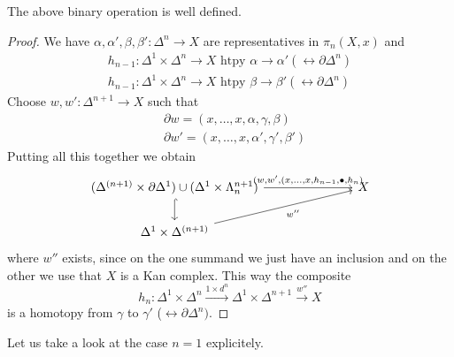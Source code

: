 \begin{prop}
    The above binary operation is well defined.
\end{prop}

\begin{proof}
    We have $\alpha,\alpha',\beta,\beta'\colon \Delta^n \to X$ are representatives in $\pi_n(X,x)$ and
    \begin{align*}
        h_{n-1} \colon \Delta^1\times \Delta^n \to X \text{ htpy } \alpha \to \alpha' (\rel \partial \Delta^n)\\
        h_{n-1} \colon \Delta^1\times \Delta^n \to X \text{ htpy } \beta \to \beta' (\rel \partial \Delta^n)
    \end{align*}
    Choose $w,w' \colon \Delta^{n+1} \to X$ such that 
    \begin{align*}
        &\partial w = (x, \dotsc, x, \alpha, \gamma, \beta)\\
        &\partial w' = (x, \dotsc, x, \alpha', \gamma', \beta')
    \end{align*}
    Putting all this together we obtain 
    \[
    \begin{tikzcd}
        (\Delta^{(n+1)} \times \partial \Delta^1) \cup (\Delta^1 \times \Lambda_n^{n+1})
        \ar[rrr, "{(w,w',(x, \dotsc , x , h_{n-1}, \bullet, h_{n})}"]
        \ar[d, hook]
        &&&
        X
        \\
        \Delta^1 \times \Delta^{(n+1)}
        \ar[rrru, "w''"']
        &&
    \end{tikzcd}
    \]
    where $w''$ exists, since on the one summand we just have an inclusion and on the other we use that $X$ is a Kan complex.
    This way the composite
    \[
    h_n \colon \Delta^1 \times \Delta^n \xrightarrow{1 \times d^n} \Delta^1 \times \Delta^{n+1} \xrightarrow{w''} X
    \]
    is a homotopy from $\gamma$ to $\gamma'$ ($\rel \partial \Delta^n)$.
\end{proof}
Let us take a look at the case $n=1$ explicitely.
    
